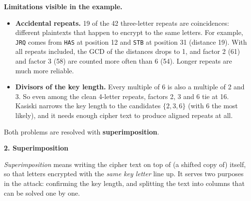 \documentclass[a4paper, 10pt]{article}
\begin{document}
\begin{problem}
\begin{subproblems_alpha}
\begin{solution}
		      \textbf{Limitations visible in the example.}
		      \begin{itemize}
			      \item \textbf{Accidental repeats.} 19 of the 42 three-letter repeats are coincidences:
			            different plaintexts that happen to encrypt to the same letters.
			            For example, \texttt{JRQ} comes from \texttt{HAS} at position 12 and \texttt{STB} at position 31 (distance 19).
			            With all repeats included, the GCD of the distances drops to 1, and factor 2 (61) and factor 3 (58) are counted more often than 6 (54).
			            Longer repeats are much more reliable.
			      \item \textbf{Divisors of the key length.} Every multiple of 6 is also a multiple of 2 and 3.
			            So even among the clean 4-letter repeats, factors 2, 3 and 6 tie at 16.
			            Kasiski narrows the key length to the candidates $\{2, 3, 6\}$ (with 6 the most likely),
			            and it needs enough cipher text to produce aligned repeats at all.
		      \end{itemize}
		      Both problems are resolved with \textbf{superimposition}.

		      \par\medskip\noindent\textbf{\large 2. Superimposition}

		      \emph{Superimposition} means writing the cipher text on top of (a shifted copy of) itself,
		      so that letters encrypted with the \emph{same key letter} line up.
		      It serves two purposes in the attack: confirming the key length, and splitting the text into columns that can be solved one by one.


\end{solution}
\end{subproblems_alpha}
\end{problem}
\end{document}
